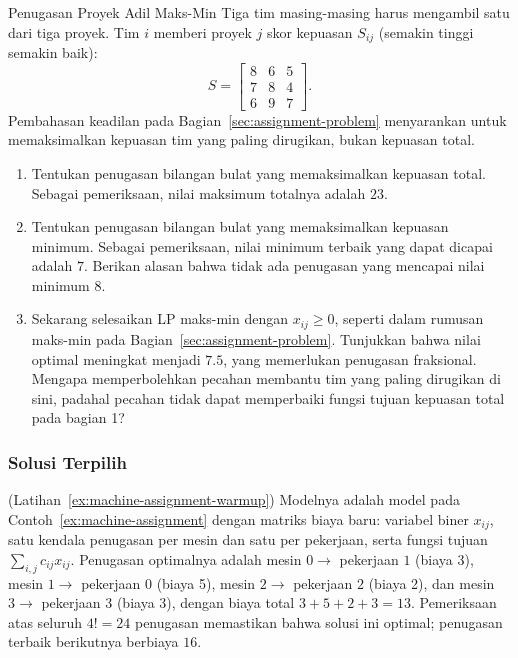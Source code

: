 \begin{ex}{Penugasan Proyek Adil Maks-Min}{}
\label{ex:maxmin-fair-assignment}
 Tiga tim masing-masing harus mengambil satu dari tiga proyek. Tim $i$ memberi proyek $j$ skor kepuasan $S_{ij}$ (semakin tinggi semakin baik):
\[
S = \begin{bmatrix} 8 & 6 & 5 \\ 7 & 8 & 4 \\ 6 & 9 & 7 \end{bmatrix}.
\]
Pembahasan keadilan pada Bagian~\ref{sec:assignment-problem} menyarankan untuk memaksimalkan kepuasan tim yang paling dirugikan, bukan kepuasan total.
\begin{enumerate}
\item Tentukan penugasan bilangan bulat yang memaksimalkan kepuasan total. Sebagai pemeriksaan, nilai maksimum totalnya adalah $23$.
\item Tentukan penugasan bilangan bulat yang memaksimalkan kepuasan minimum. Sebagai pemeriksaan, nilai minimum terbaik yang dapat dicapai adalah $7$. Berikan alasan bahwa tidak ada penugasan yang mencapai nilai minimum $8$.
\item Sekarang selesaikan LP maks-min dengan $x_{ij} \geq 0$, seperti dalam rumusan maks-min pada Bagian~\ref{sec:assignment-problem}. Tunjukkan bahwa nilai optimal meningkat menjadi $7.5$, yang memerlukan penugasan fraksional. Mengapa memperbolehkan pecahan membantu tim yang paling dirugikan di sini, padahal pecahan tidak dapat memperbaiki fungsi tujuan kepuasan total pada bagian 1?
\end{enumerate}
\exrefs{\S\ref{sec:assignment-problem}}
\end{ex}

\subsubsection*{Solusi Terpilih}

\begin{solution}(Latihan~\ref{ex:machine-assignment-warmup})
Modelnya adalah model pada Contoh~\ref{ex:machine-assignment} dengan matriks biaya baru: variabel biner $x_{ij}$, satu kendala penugasan per mesin dan satu per pekerjaan, serta fungsi tujuan $\sum_{i,j} c_{ij} x_{ij}$. Penugasan optimalnya adalah mesin $0 \to$ pekerjaan $1$ (biaya 3), mesin $1 \to$ pekerjaan $0$ (biaya 5), mesin $2 \to$ pekerjaan $2$ (biaya 2), dan mesin $3 \to$ pekerjaan $3$ (biaya 3), dengan biaya total $3 + 5 + 2 + 3 = 13$. Pemeriksaan atas seluruh $4! = 24$ penugasan memastikan bahwa solusi ini optimal; penugasan terbaik berikutnya berbiaya $16$.
\end{solution}

